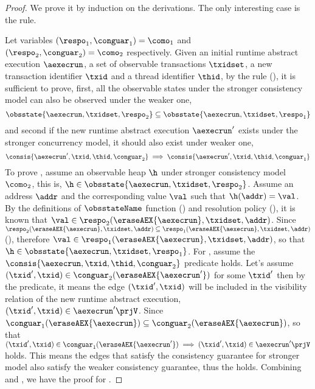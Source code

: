 \begin{proof}
We prove it by induction on the derivations.
The only interesting case is the  rule.


Let variables \( (\respo_{1}, \conguar_{1}) = \como_{1} \) and  \( (\respo_{2}, \conguar_{2}) = \como_{2} \) respectively.
Given an initial runtime abstract execution \( \aexecrun \), a set of observable transactions \( \txidset \), a new transaction identifier \( \txid \) and a thread identifier \( \thid \), by the  rule (), it is sufficient to prove, first, all the observable states under the stronger consistency model can also be observed under the weaker one,
\begin{equation}
    \label{equ:obs-state-included}
    \obsstate{\aexecrun, \txidset, \respo_{2}} \subseteq  \obsstate{\aexecrun, \txidset, \respo_{1}} 
\end{equation}
and second if the new runtime abstract execution \( \aexecrun' \) exists under the stronger concurrency model, it should also exist under weaker one,
\begin{equation}
    \label{equ:consis-both-exist}
    \consis{\aexecrun', \txid, \thid, \conguar_{2}} \implies \consis{\aexecrun', \txid, \thid, \conguar_{1}}
\end{equation}
To prove , assume an observable heap \( \h \) under stronger consistency model \( \como_{2}\), this is, \( \h \in \obsstate{\aexecrun, \txidset, \respo_{2}} \).
Assume an address \( \addr\) and the corresponding value \( \val \) such that \(  \h(\addr) = \val \).
By the definitions of \( \obsstateName \) function  () and resolution policy (), it is known that \( \val \in \respo_{2}(\eraseAEX{\aexecrun}, \txidset, \addr)  \).
Since \( \respo_{2}(\eraseAEX{\aexecrun}, \txidset, \addr) \subseteq \respo_{1}(\eraseAEX{\aexecrun}, \txidset, \addr) \) (), therefore \(  \val \in \respo_{1}(\eraseAEX{\aexecrun}, \txidset, \addr) \), so that \( \h \in \obsstate{\aexecrun, \txidset, \respo_{1}} \).
For , assume the \( \consis{\aexecrun, \txid, \thid, \conguar_{2}} \) predicate holds.
Let's assume \( (\txid', \txid) \in \conguar_{2}(\eraseAEX{\aexecrun'}) \) for some \( \txid' \) then by the predicate, it means the edge \( (\txid', \txid) \) will be included in the visibility relation of the new runtime abstract execution, \ie \( (\txid', \txid) \in \aexecrun'\prjV \).
Since \( \conguar_{1}(\eraseAEX{\aexecrun}) \subseteq \conguar_{2}(\eraseAEX{\aexecrun})\), so that \( (\txid', \txid) \in \conguar_{1}(\eraseAEX{\aexecrun'}) \implies (\txid', \txid) \in \aexecrun'\prjV \) holds.
This means the edges that satisfy the consistency guarantee for stronger model also satisfy the weaker consistency guarantee,
thus the  holds.
Combining  and , we have the proof for .


\end{proof}
